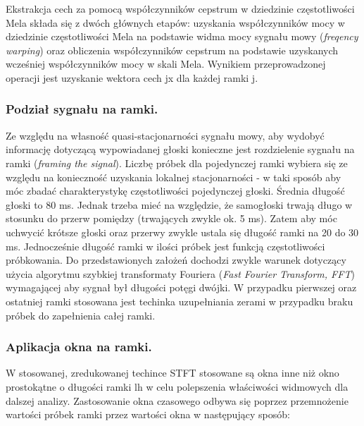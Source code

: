 
Ekstrakcja cech za pomocą współczynników cepstrum w dziedzinie częstotliwości Mela składa się z dwóch głównych etapów: uzyskania współczynników mocy w dziedzinie częstotliwości Mela na podstawie widma mocy sygnału mowy (\textit{freqency warping}) oraz obliczenia współczynników cepstrum na podstawie uzyskanych wcześniej współczynników mocy w skali Mela. Wynikiem przeprowadzonej operacji jest uzyskanie wektora cech jx dla każdej ramki j.
%

\subsubsection{Podział sygnału na ramki.}
Ze względu na własność quasi-stacjonarności sygnału mowy, aby wydobyć informację dotyczącą wypowiadanej głoski konieczne jest rozdzielenie sygnału na ramki (\textit{framing the signal}).
Liczbę próbek dla pojedynczej ramki wybiera się ze względu na konieczność uzyskania lokalnej stacjonarności - w taki sposób aby móc zbadać charakterystykę częstotliwości pojedynczej głoski. Średnia długość głoski to 80 ms. Jednak trzeba mieć na względzie, że samogłoski trwają długo w stosunku do przerw pomiędzy (trwających zwykle ok. 5 ms). Zatem aby móc uchwycić krótsze głoski oraz przerwy zwykle ustala się długość ramki na 20 do 30 ms. Jednocześnie długość ramki w ilości próbek jest funkcją częstotliwości próbkowania. Do przedstawionych założeń dochodzi zwykle warunek dotyczący użycia algorytmu szybkiej transformaty Fouriera (\textit{Fast Fourier Transform, FFT}) wymagającej aby sygnał był długości potęgi dwójki. W przypadku pierwszej oraz ostatniej ramki stosowana jest techinka uzupełniania zerami w przypadku braku próbek do zapełnienia całej ramki.

\subsubsection{Aplikacja okna na ramki.}
W stosowanej, 
zredukowanej techince STFT stosowane są okna inne niż okno prostokątne o długości ramki lh w celu polepszenia właściwości widmowych dla dalszej analizy. Zastosowanie okna czasowego odbywa się poprzez przemnożenie wartości próbek ramki przez wartości okna w następujący sposób:

